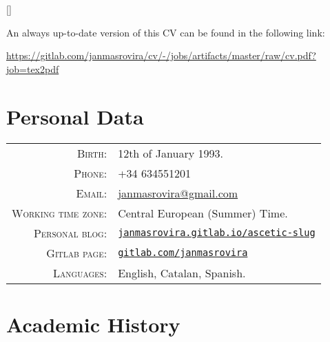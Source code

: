 \documentclass[11pt]{article}
\begin{document}
\par{\bigskip\par}
\titleformat{\section}{\Large\scshape\raggedright}{}{0em}{}[\titlerule]

An always up-to-date version of this CV can be found in the following link:
\begin{center}
\url{https://gitlab.com/janmasrovira/cv/-/jobs/artifacts/master/raw/cv.pdf?job=tex2pdf}
\end{center}

\section{Personal Data}

\begin{tabular}{rl}
\textsc{Birth:} & 12th of January 1993.\\
\textsc{Phone:} & +34 634551201\\
\textsc{Email:} & \href{mailto:janmasrovira@gmail.com}{janmasrovira@gmail.com} \\
\textsc{Working time zone:} & Central European (Summer) Time.  \\
\textsc{Personal blog:} & \href{https://janmasrovira.gitlab.io/ascetic-slug/}{\texttt{janmasrovira.gitlab.io/ascetic-slug}} \\
\textsc{Gitlab page:} & \href{https://gitlab.com/janmasrovira}{\texttt{gitlab.com/janmasrovira}} \\
\textsc{Languages:} & English, Catalan, Spanish.
\end{tabular}

\section{Academic History}
\end{document}
